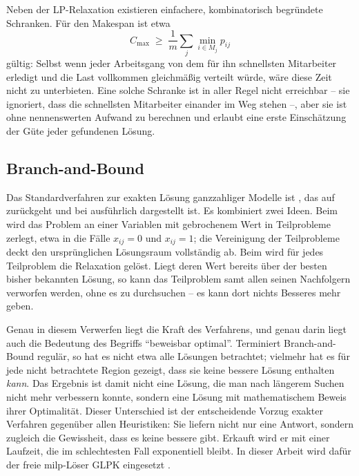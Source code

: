 Neben der LP-Relaxation existieren einfachere, kombinatorisch begründete
Schranken. Für den Makespan ist etwa
\begin{equation}
  C_{\max} \;\ge\; \frac{1}{m} \sum_{j} \min_{i \in M_j} p_{ij}
  \label{eq:schranke-allgemein}
\end{equation}
gültig: Selbst wenn jeder Arbeitsgang von dem für ihn schnellsten Mitarbeiter
erledigt und die Last vollkommen gleichmäßig verteilt würde, wäre diese Zeit
nicht zu unterbieten. Eine solche Schranke ist in aller Regel nicht erreichbar
-- sie ignoriert, dass die schnellsten Mitarbeiter einander im Weg stehen --,
aber sie ist ohne nennenswerten Aufwand zu berechnen und erlaubt eine erste
Einschätzung der Güte jeder gefundenen Lösung.

\subsection{Branch-and-Bound}

Das Standardverfahren zur exakten Lösung ganzzahliger Modelle ist
, das auf \textcite{land1960automatic} zurückgeht und
bei \textcite{nemhauser1988integer} ausführlich dargestellt ist. Es kombiniert
zwei Ideen. Beim  wird das Problem an einer Variablen mit
gebrochenem Wert in Teilprobleme zerlegt, etwa in die Fälle $x_{ij} = 0$ und
$x_{ij} = 1$; die Vereinigung der Teilprobleme deckt den ursprünglichen
Lösungsraum vollständig ab. Beim  wird für jedes Teilproblem
die Relaxation gelöst. Liegt deren Wert bereits über der besten bisher
bekannten Lösung, so kann das Teilproblem samt allen seinen Nachfolgern
verworfen werden, ohne es zu durchsuchen -- es kann dort nichts Besseres mehr
geben.

Genau in diesem Verwerfen liegt die Kraft des Verfahrens, und genau darin liegt
auch die Bedeutung des Begriffs \enquote{beweisbar optimal}. Terminiert
Branch-and-Bound regulär, so hat es nicht etwa alle Lösungen betrachtet;
vielmehr hat es für jede nicht betrachtete Region gezeigt, dass sie keine
bessere Lösung enthalten \emph{kann}. Das Ergebnis ist damit nicht eine Lösung,
die man nach längerem Suchen nicht mehr verbessern konnte, sondern eine Lösung
mit mathematischem Beweis ihrer Optimalität. Dieser Unterschied ist der
entscheidende Vorzug exakter Verfahren gegenüber allen Heuristiken: Sie liefern
nicht nur eine Antwort, sondern zugleich die Gewissheit, dass es keine bessere
gibt. Erkauft wird er mit einer Laufzeit, die im schlechtesten Fall exponentiell
bleibt. In dieser Arbeit wird dafür der freie \ac{milp}-Löser GLPK eingesetzt
\parencite{glpk}.


